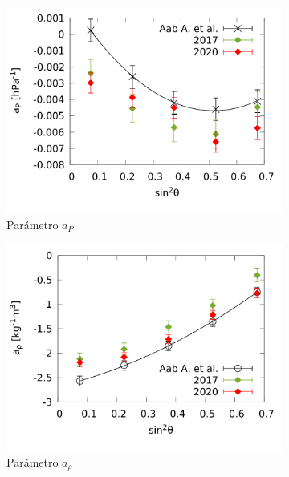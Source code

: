 				\begin{figure}[H]
					\begin{subfigure}[b]{0.5\textwidth}
					\includegraphics[width=\linewidth]{../Anisotropia/params/ap_2017_2020_above_1EeV.png}
					\caption{Parámetro $a_P$ }
					\end{subfigure}%
					\hspace{\fill}
					\begin{subfigure}[b]{0.5\textwidth}
					\includegraphics[width=\linewidth]{../Anisotropia/params/arho_2017_2020_above_1EeV.png}
					\caption{Parámetro $a_{\rho}$ }
					\end{subfigure}%
					\hspace{\fill}
					\begin{subfigure}[b]{\textwidth}

\end{subfigure}
\end{figure}

